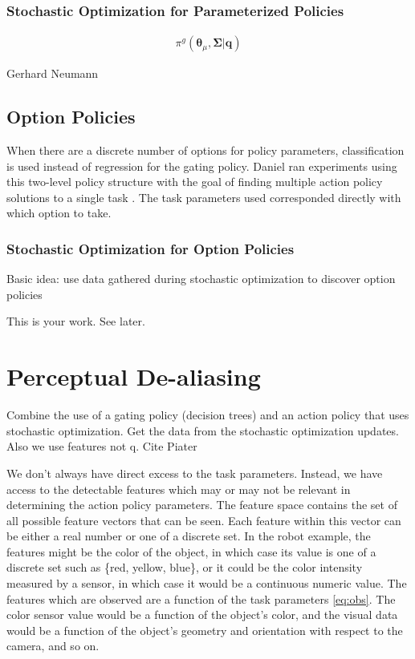 \documentclass[12pt]{article}
\newcommand{\polg}   {\ensuremath{\pi^g}}
\newcommand{\taskp}  {\ensuremath{\mathbf{q}}}
\newcommand{\app}    {\ensuremath{\bm{\theta}}}
\newcommand{\covar}  {\ensuremath{\bm{\Sigma}}}
\begin{document}
\subsubsection{Stochastic Optimization for Parameterized Policies}

\begin{align}
\label{eq:gating_par}\polg(\app_\mu,\covar|\taskp)
\end{align}

Gerhard Neumann



\subsection{Option Policies}

When there are a discrete number of options for policy parameters, classification is used instead of regression for the gating policy. Daniel ran experiments using this two-level policy structure with the goal of finding multiple action policy solutions to a single task \cite{daniel}. The task parameters used corresponded directly with which option to take. 

\subsubsection{Stochastic Optimization for Option Policies}

Basic idea: use data gathered during stochastic optimization to discover option policies

This is your work. See later.


\section{Perceptual De-aliasing}

\color{red}Combine the use of a gating policy (decision trees) and an action policy that uses stochastic optimization. Get the data from the stochastic optimization updates. Also we use features not q. Cite Piater\color{black}

We don't always have direct excess to the task parameters. Instead, we have access to the detectable features which may or may not be relevant in determining the action policy parameters.  The feature space contains the set of all possible feature vectors that can be seen. Each feature within this vector can be either a real number or one of a discrete set. In the robot example, the features might be the color of the object, in which case its value is one of a discrete set such as \{red, yellow, blue\}, or it could be the color intensity measured by a sensor, in which case it would be a continuous numeric value. The features which are observed are a function of the task parameters \eqref{eq:obs}. The color sensor value would be a function of the object's color, and the visual data would be a function of the object's geometry and orientation with respect to the camera, and so on.
\end{document}

